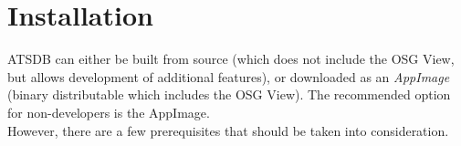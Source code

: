 \chapter{Installation}
\label{sec:installation}

ATSDB can either be built from source (which does not include the OSG View, but allows development of additional features), or downloaded as an \textit{AppImage} (binary distributable which includes the OSG View). The recommended option for non-developers is the AppImage. \\

However, there are a few prerequisites that should be taken into consideration.








